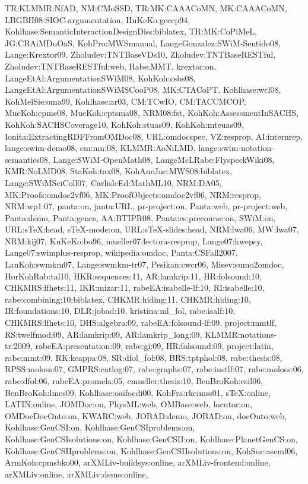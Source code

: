 {TR:KLMMR:NfAD,
NM:CMoSSD,
TR:MK:CAAACoMN,
MK:CAAACoMN,
LBGBH08:SIOC-argumentation,
HuKeKo:gcccp94,
Kohlhase:SemanticInteractionDesignDiss:biblatex,
TR:MK:CoPiMeL,
JG:CRAiMDuOaS,
KohPro:MWSmanual,
LangeGonzalez:SWiM-Sentido08,
Lange:Krextor09,
Zholudev:TNTBaseVDs10,
Zholudev:TNTBaseRESTful,
Zholudev:TNTBaseRESTful:web,
Rabe:MMT,
krextor:on,
LangeEtAl:ArgumentationSWiM08,
KohKoh:csbs08,
LangeEtAl:ArgumentationSWiMSCooP08,
MK:CTACoPT,
Kohlhase:wcl08,
KohMelSie:oma99,
Kohlhase:ar03,
CM:TCwIO,
CM:TACCMCOP,
MueKoh:cpme08,
MueKoh:cptsma08,
NRM08:fst,
KohKoh:AssessmentInSACHS,
KohKoh:SACHSCoverage10,
KohKoh:stuas09,
KohKoh:mteuas09,
Ionita:ExtractingRDFFromOMDoc08,
URL:omdocspec,
VZ:resprop,
AI:internrep,
lange:swim-demo08,
cm:mn:08,
KLMMR:AoNiLMD,
lange:swim-notation-semantics08,
Lange:SWiM-OpenMath08,
LangeMcLRabe:FlyspeckWiki08,
KMR:NoLMD08,
StaKoh:tax08,
KohAncJuc:MWS08:biblatex,
Lange:SWiMSciColl07,
CarlisleEd:MathML10,
NRM:DA05,
MK:Proofs:omdoc2vf06,
MK:ProofObjects:omdoc2vf06,
NRM:resprop,
NRM:wp1:07,
panta:on,
janta:URL,
pr-project:on,
Panta:web,
pr-project:web,
Panta:demo,
Panta:gencs,
AA:BTIPR08,
Panta:cs:precourse:on,
SWiM:on,
URL:sTeX:head,
sTeX-mode:on,
URL:sTeX-slides:head,
NRM:lwa06,
MW:lwa07,
NRM:kij07,
KuKeKo:bo96,
mueller07:lectora-resprop,
Lange07:kwepsy,
Lange07:swimplus-resprop,
wikipedia:omdoc,
Panta:CSFall2007,
LanKoh:swmkm07,
Lange:swmkm-tr07,
Pesikan:cwcr06,
Misev:sumo2omdoc,
HorKohRab:tal10,
HKR:sequences:11,
AR:lamkrip:11,
HR:folsound:10,
CHKMRS:lfhets:11,
IKR:mizar:11,
rabeEA:isabelle-lf:10,
RI:isabelle:10,
rabe:combining:10:biblatex,
CHKMR:hiding:11,
CHKMR:hiding:10,
IR:foundations:10,
DLR:jobad:10,
kristina:ml_fol,
rabe:isalf:10,
CHKMRS:lfhets:10,
DHS:algebra:09,
rabeEA:folsound-lf:09,
project:mmtlf,
RS:twelfmod:09,
AR:lamkrip:09,
AR:lamkrip_long:09,
KLMMR:notations-tr:2009,
rabeEA:presentation:09,
rabe:gi:09,
HR:folsound:09,
project:latin,
rabe:mmt:09,
RK:keappa:08,
SR:dfol_fol:08,
BRS:tptphol:08,
rabe:thesis:08,
RPSS:moloss:07,
GMPRS:catlog:07,
rabe:graphs:07,
rabe:instlf:07,
rabe:moloss:06,
rabe:dfol:06,
rabeEA:promela:05,
cmueller:thesis:10,
BenBroKoh:csil06,
BenBroKoh:lmcs09,
Kohlhase:oaifocdi00,
KohFra:rkcimss01,
sTeX:online,
LATIN:online,
JOMDoc:on,
PhysML:web,
OMBase:web,
locutor:on,
OMDocDocOnto:on,
KWARC:web,
JOBAD:demo,
JOBAD:on,
docOnto:web,
Kohlhase:GenCSI:on,
Kohlhase:GenCSIproblems:on,
Kohlhase:GenCSIsolutions:on,
Kohlhase:GenCSII:on,
Kohlhase:PlanetGenCS:on,
Kohlhase:GenCSIIproblems:on,
Kohlhase:GenCSIIsolutions:on,
KohSuc:asemf06,
ArmKoh:cpmsbko00,
arXMLiv-buildsys:online,
arXMLiv-frontend:online,
arXMLiv:online,
arXMLiv:demo:online,
}
